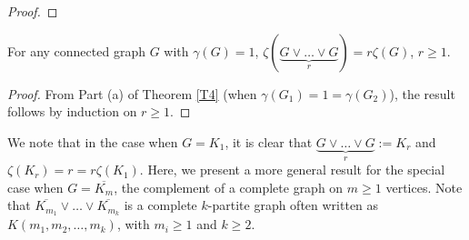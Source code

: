 \documentclass[twoside,12pt]{article}
\begin{document}
\begin{proof}



\end{proof}
\begin{corollary}
For any connected graph $G$ with $\gamma(G)=1$, $\zeta(\underbrace{G\vee \ldots \vee G}_r)=r\zeta(G)$, $r\ge 1$.
\end{corollary}
\begin{proof}
From Part (a) of Theorem \ref{T4} (when $\gamma(G_1)=1=\gamma(G_2)$), the result follows by induction on $r\ge 1$.
\end{proof}
We note that in the case when $G=K_1$, it is clear that $\underbrace{G\vee \ldots \vee G}_r:=K_r$ and $\zeta(K_r)=r=r\zeta(K_1)$. Here, we present a more general result for the special case when $G=\overline{K_{m}}$, the complement of a complete graph on $m\ge 1$ vertices. Note that $\overline{K_{m_1}} \vee \ldots \vee \overline{K_{m_k}}$ is a complete $k$-partite graph often written as $K(m_1,m_2,\ldots, m_k)$, with $m_i\ge 1$ and $k\ge 2$.
\end{document}
